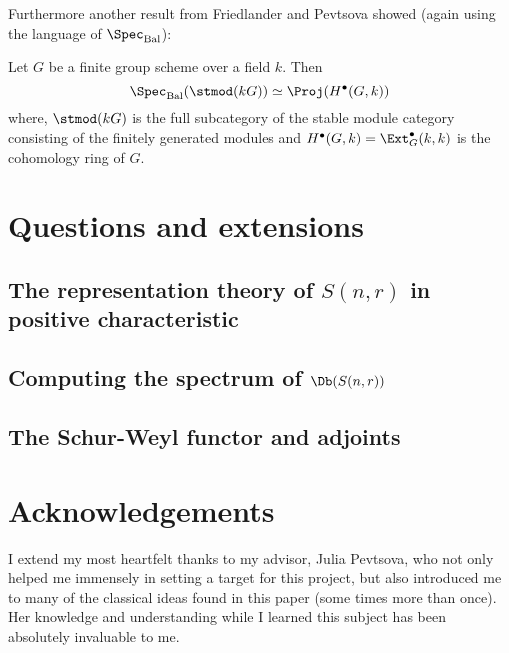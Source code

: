 \documentclass[12pt]{article}
\begin{document}
Furthermore another result from Friedlander and Pevtsova \cite{friedlander-pevtsova-pi} showed (again using 
the language of $\Spec_\text{Bal}$):
\begin{thm}
	Let $G$ be a finite group scheme over a field $k$. Then 
	\[\Spec_\text{Bal}(\stmod(kG))\simeq\Proj(H^\bullet(G,k))\]
	where, $\stmod(kG)$ is the full subcategory of the stable module category consisting of the finitely generated modules and $H^\bullet(G,k)=\Ext_G^\bullet(k,k)$ is the cohomology ring of $G$.
\end{thm}

\newpage
\section{Questions and extensions}
\subsection{The representation theory of \texorpdfstring{$S(n,r)$}{S(n,r)} in positive characteristic}

\subsection{Computing the spectrum of \texorpdfstring{$\Db(S(n,r))$}{DbS(n,r)}}

\subsection{The Schur-Weyl functor and adjoints}

\newpage
\section*{Acknowledgements}
\label{sec:ack}
I extend my most heartfelt thanks to my advisor, Julia Pevtsova, who not only helped me immensely in setting a target 
for this project, but also introduced me to many of the classical ideas found in this paper (some times more than once). 
Her knowledge and understanding while I learned this subject has been absolutely invaluable to me.
\end{document}
